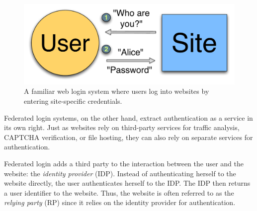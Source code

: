 \documentclass{llncs}
\begin{document}

\begin{figure}
  \centering
  \includegraphics[scale=0.5]{figs/fig-passwd-color.pdf}
  \caption{A familiar web login system where users log into websites
    by entering site-specific credentials.}
  \label{fig:passwd}
\end{figure}

Federated login systems, on the other hand, extract authentication as
a service in its own right. Just as websites rely on third-party services
for traffic analysis, CAPTCHA verification, or file hosting, they can
also rely on separate services for authentication.

Federated login adds a third party to the interaction between the user
and the website: the \emph{identity provider} (IDP). Instead of
authenticating herself to the website directly, the user authenticates
herself to the IDP. The IDP then returns a user identifier to the
website. Thus, the website is often referred to as the \emph{relying
  party} (RP) since it relies on the identity provider for
authentication.
\end{document}
